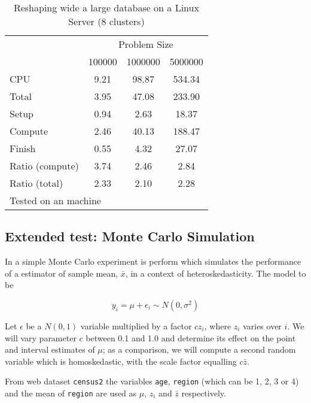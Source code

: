 \documentclass[letterpaper, 10pt]{article}
\begin{document}
\begin{table}[!h]
\centering
\caption{Reshaping wide a large database on a Linux Server (8 clusters)}
\begin{tabular}{l*{3}{c}}\hline
& \multicolumn{3}{c}{Problem Size} \\
& 100000 &         1000000 &         5000000 \\ \hline
CPU &     9.21 &     98.87 &    534.34 \\
Total &     3.95 &     47.08 &    233.90 \\
\hspace{2mm} Setup &     0.94 &      2.63 &     18.37 \\
\hspace{2mm} Compute &     2.46 &     40.13 &    188.47 \\
\hspace{2mm} Finish &     0.55 &      4.32 &     27.07 \\
\hline Ratio (compute) &     3.74 &      2.46 &      2.84 \\
Ratio (total) &     2.33 &      2.10 &      2.28 \\
\hline
\multicolumn{4}{l}{\footnotesize Tested on an \unix1 machine}
\end{tabular}
\end{table}

\pagebreak

\subsection{Extended test: Monte Carlo Simulation}

In  a simple Monte Carlo experiment is perform which simulates the performance of a estimator of sample mean, $\bar x$, in a context of heteroskedasticity. The model to be

\begin{equation}
y_i = \mu + \epsilon_i \sim N(0,\sigma^2)
\end{equation}

Let $\epsilon$ be a $N(0,1)$ variable multiplied by a factor $cz_i$, where $z_i$ varies over $i$. We will vary parameter $c$ between 0.1 and 1.0 and determine its effect on the point and interval estimates of $\mu$; as a comparison, we will compute a second random variable which is homoskedastic, with the scale factor equalling $c\bar z$.

From web dataset {\tt census2} the variables {\tt age}, {\tt region} (which can be 1, 2, 3 or 4) and the mean of {\tt region} are used as $\mu$, $z_i$ and $\bar z$ respectively.
\end{document}
